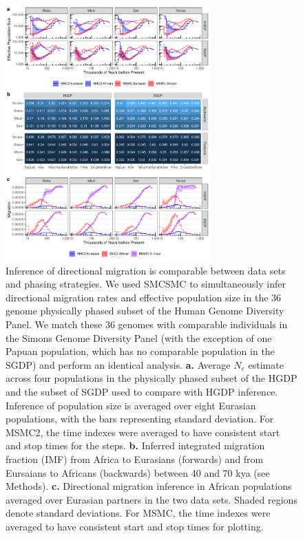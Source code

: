 \begin{figure}
	\centering
	\includegraphics[width=0.7\textwidth]{plot/both_figure.pdf}
	\caption[Migration inference is comparable between phasing strategies]{Inference of directional migration is comparable between data sets and phasing strategies. We used SMCSMC to simultaneously infer directional migration rates and effective population size in the 36 genome physically phased subset of the Human Genome Diversity Panel. We match these 36 genomes with comparable individuals in the Simons Genome Diversity Panel (with the exception of one Papuan population, which has no comparable population in the SGDP) and perform an identical analysis. {\bf a.} Average $N_e$ estimate across four populations in the physically phased subset of the HGDP and the subset of SGDP used to compare with HGDP inference. Inference of population size is averaged over eight Eurasian populations, with the bars representing standard deviation. For MSMC2, the time indexes were averaged to have consistent start and stop times for the steps. {\bf b.} Inferred integrated migration fraction (IMF) from Africa to Eurasians (forwards) and from Eursaians to Africans (backwards) between 40 and 70 kya (see Methods). {\bf c.} Directional migration inference in African populations averaged over Eurasian partners in the two data sets. Shaded regions denote standard deviations. For MSMC, the time indexes were averaged to have consistent start and stop times for plotting.}
	\label{fig:both}
\end{figure}

